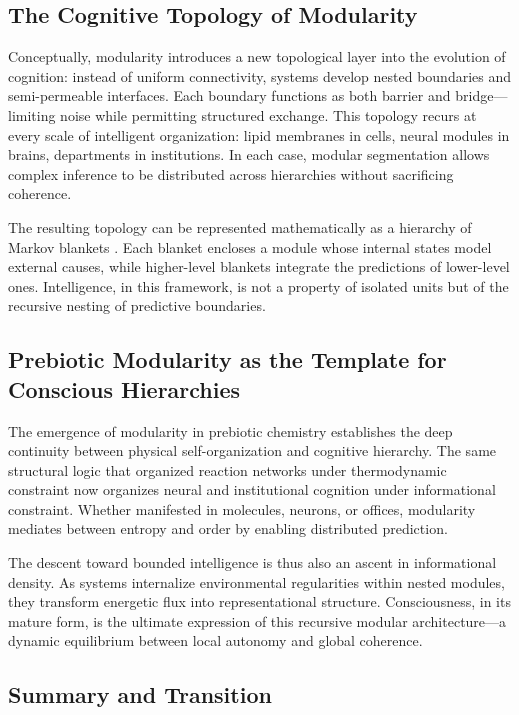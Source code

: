 \documentclass[11pt,a4paper]{article}
\begin{document}
\subsection{The Cognitive Topology of Modularity}

Conceptually, modularity introduces a new topological layer into the evolution of cognition: instead of uniform connectivity, systems develop nested boundaries and semi-permeable interfaces.  Each boundary functions as both barrier and bridge—limiting noise while permitting structured exchange.  This topology recurs at every scale of intelligent organization: lipid membranes in cells, neural modules in brains, departments in institutions.  In each case, modular segmentation allows complex inference to be distributed across hierarchies without sacrificing coherence.

The resulting topology can be represented mathematically as a hierarchy of Markov blankets \citep{Friston2013LifeAsWeKnowIt}.  Each blanket encloses a module whose internal states model external causes, while higher-level blankets integrate the predictions of lower-level ones.  Intelligence, in this framework, is not a property of isolated units but of the recursive nesting of predictive boundaries.

\subsection{Prebiotic Modularity as the Template for Conscious Hierarchies}

The emergence of modularity in prebiotic chemistry establishes the deep continuity between physical self-organization and cognitive hierarchy.  The same structural logic that organized reaction networks under thermodynamic constraint now organizes neural and institutional cognition under informational constraint.  Whether manifested in molecules, neurons, or offices, modularity mediates between entropy and order by enabling distributed prediction.

The descent toward bounded intelligence is thus also an ascent in informational density.  As systems internalize environmental regularities within nested modules, they transform energetic flux into representational structure.  Consciousness, in its mature form, is the ultimate expression of this recursive modular architecture—a dynamic equilibrium between local autonomy and global coherence.

\subsection{Summary and Transition}
\end{document}
